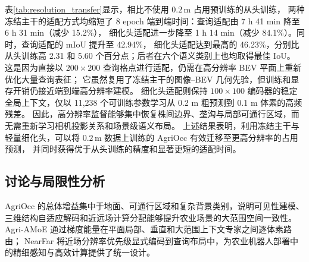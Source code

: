 \documentclass[a4paper,fleqn]{cas-sc}
\begin{document}
\begin{table}[pos=htbp]
\centering
\caption{$0.1\,\mathrm{m}$ 体素分辨率的迁移结果（IoU 为\%，时间为 8 epoch 端到端墙钟耗时，含逐 epoch 验证）。
迁移方法先在 $0.2\times0.2\times0.2\,\mathrm{m}$ 数据上训练，再冻结已有主干并适配至 $0.1\times0.1\times0.2\,\mathrm{m}$。}
\label{tab:resolution_transfer}
\fontsize{9}{11}\selectfont
\setlength{\tabcolsep}{2.4pt}
\end{table}

表\ref{tab:resolution_transfer}显示，相比不使用 $0.2\,\mathrm{m}$ 占用预训练的从头训练，
两种冻结主干的适配方式均缩短了 8 epoch 端到端时间：查询适配由 7 h 41 min 降至 6 h 31 min（减少 15.2\%），
细化头适配进一步降至 1 h 14 min（减少 84.1\%）。同时，查询适配的 mIoU 提升至 42.94\%，
细化头适配达到最高的 46.23\%，分别比从头训练高 2.31 和 5.60 个百分点；后者在六个语义类别上也均取得最佳 IoU。
这是因为直接以 $200\times200$ 查询格点进行适配，仍需在高分辨率 BEV 平面上重新优化大量查询表征；
它虽然复用了冻结主干的图像--BEV 几何先验，但训练和显存开销仍接近端到端高分辨率建模。
细化头适配则保持 $100\times100$ 编码器的稳定全局上下文，仅以 11,238 个可训练参数学习从 0.2 m 粗预测到 0.1 m 体素的高频残差。
因此，高分辨率监督能够集中恢复株间边界、垄沟与局部可通行区域，而无需重新学习相机投影关系和场景级语义布局。
上述结果表明，利用冻结主干与轻量细化头，可以将 $0.2\,\mathrm{m}$ 数据上训练的 AgriOcc 有效迁移至更高分辨率的占用预测，
并同时获得优于从头训练的精度和显著更短的适配时间。

\subsection{讨论与局限性分析}\label{sec:discussion}
AgriOcc 的总体增益集中于地面、可通行区域和复杂背景类别，说明可见性建模、
三维结构自适应解码和近远场计算分配能够提升农业场景的大范围空间一致性。
Agri-AMoE 通过梯度能量在平面局部、垂直和大范围上下文专家之间逐体素路由；
NearFar 将近场分辨率优先级显式编码到查询布局中，为农业机器人部署中的精细感知与高效计算提供了统一设计。
\end{document}
